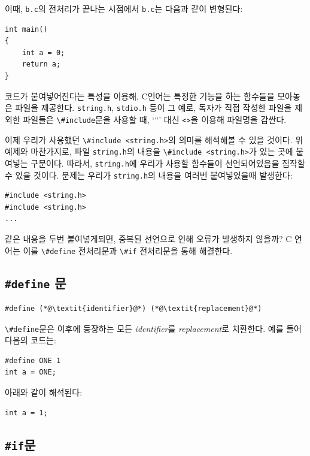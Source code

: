 \documentclass[a4paper,12pt]{book}
\newcommand{\V}[1]{\Verb|#1|}
\begin{document}
    이때, \V{b.c}의 전처리가 끝나는 시점에서 \V{b.c}는 다음과 같이 변형된다:

    \begin{lstlisting}
int main()
{
    int a = 0;
    return a;
}
    \end{lstlisting}

    코드가 붙여넣어진다는 특성을 이용해,
    C언어는 특정한 기능을 하는 함수들을 모아놓은 파일을 제공한다.
    \V{string.h}, \V{stdio.h} 등이 그 예로,
    독자가 직접 작성한 파일을 제외한 파일들은 \V{\#include}문을 사용할 때,
    `\V{"}' 대신 \V{<>}을 이용해 파일명을 감싼다.

    이제 우리가 사용했던 \V{\#include <string.h>}의 의미를 해석해볼 수 있을 것이다.
    위 예제와 마찬가지로, 파일 \V{string.h}의 내용을 \V{\#include <string.h>}가 있는 곳에 붙여넣는 구문이다.
    따라서, \V{string.h}에 우리가 사용할 함수들이 선언되어있음을 짐작할 수 있을 것이다.
    문제는 우리가 \V{string.h}의 내용을 여러번 붙여넣었을때 발생한다:

    \begin{lstlisting}
#include <string.h>
#include <string.h>
...
    \end{lstlisting}

    같은 내용을 두번 붙여넣게되면, 중복된 선언으로 인해 오류가 발생하지 않을까?
    C 언어는 이를 \V{\#define} 전처리문과 \V{\#if} 전처리문을 통해 해결한다.

    \subsection{\texttt{\#define} 문}

        \begin{lstlisting}  
#define (*@\textit{identifier}@*) (*@\textit{replacement}@*)
        \end{lstlisting}

        \V{\#define}문은 이후에 등장하는 모든 \textit{identifier}를 \textit{replacement}로 치환한다.
        예를 들어 다음의 코드는:

        \begin{lstlisting}
#define ONE 1
int a = ONE;
        \end{lstlisting}

        아래와 같이 해석된다:

        \begin{lstlisting}
int a = 1;
        \end{lstlisting}

    \subsection{\texttt{\#if}문}
\end{document}

